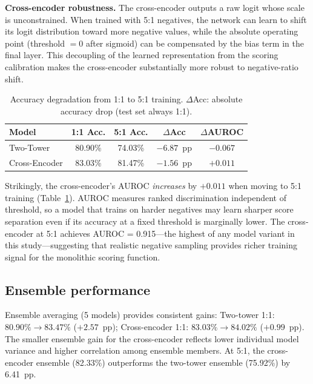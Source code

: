 \documentclass[10pt,twocolumn]{article}
\begin{document}
\textbf{Cross-encoder robustness.}
The cross-encoder outputs a raw logit whose scale is unconstrained.
When trained with 5:1 negatives, the network can learn to shift its logit
distribution toward more negative values, while the absolute operating point
(threshold $= 0$ after sigmoid) can be compensated by the bias term in the
final layer.
This decoupling of the learned representation from the scoring calibration
makes the cross-encoder substantially more robust to negative-ratio shift.

\begin{table}[!htbp]
\centering
\caption{Accuracy degradation from 1:1 to 5:1 training. $\Delta$Acc: absolute
accuracy drop (test set always 1:1).}
\label{tab:ratio_degradation}
\small
\begin{tabular}{@{}lcccc@{}}
\toprule
\textbf{Model} & \textbf{1:1 Acc.} & \textbf{5:1 Acc.} & \textbf{$\Delta$Acc} & \textbf{$\Delta$AUROC} \\
\midrule
Two-Tower     & 80.90\% & 74.03\% & $-6.87$~pp & $-0.067$ \\
Cross-Encoder & 83.03\% & 81.47\% & $-1.56$~pp & $+0.011$ \\
\bottomrule
\end{tabular}
\end{table}

Strikingly, the cross-encoder's AUROC \emph{increases} by $+0.011$ when
moving to 5:1 training (Table~\ref{tab:ratio_degradation}).
AUROC measures ranked discrimination independent of threshold, so a model
that trains on harder negatives may learn sharper score separation even if its
accuracy at a fixed threshold is marginally lower.
The cross-encoder at 5:1 achieves AUROC = 0.915---the highest of any model
variant in this study---suggesting that realistic negative sampling provides
richer training signal for the monolithic scoring function.

\subsection{Ensemble performance}
\label{sec:ensemble_results}

Ensemble averaging (5 models) provides consistent gains:
Two-tower 1:1: $80.90\% \to 83.47\%$ ($+2.57$~pp);
Cross-encoder 1:1: $83.03\% \to 84.02\%$ ($+0.99$~pp).
The smaller ensemble gain for the cross-encoder reflects lower individual model
variance and higher correlation among ensemble members.
At 5:1, the cross-encoder ensemble (82.33\%) outperforms the two-tower ensemble
(75.92\%) by 6.41~pp.
\end{document}
